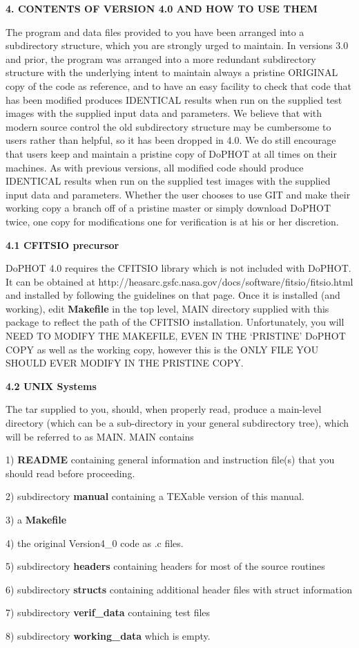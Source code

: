 \centerline{\bf 4.  CONTENTS OF VERSION 4.0 AND HOW TO USE THEM}

	The program and data files provided to you have been arranged 
into a subdirectory structure, which you are strongly urged to maintain.
In versions 3.0 and prior, the program was arranged into a more 
redundant subdirectory structure with the underlying intent to maintain 
always a pristine ORIGINAL copy of the code as reference, and to have 
an easy facility to check that code that has been modified produces 
IDENTICAL results when run on the supplied test images with the 
supplied input data and parameters. We believe that with modern 
source control the old subdirectory structure may be cumbersome to 
users rather than helpful, so it has been dropped in 4.0.  We do still 
encourage that users keep and maintain a pristine copy of DoPHOT
at all times on their machines.  As with previous versions, all modified 
code should produce IDENTICAL results when run on the supplied test 
images with the supplied input data and parameters.  Whether the user 
chooses to use GIT and make their working copy a branch off of a pristine 
master or simply download DoPHOT twice, one copy for modifications 
one for verification is at his or her discretion.

\centerline{\bf 4.1 CFITSIO precursor}
	DoPHOT 4.0 requires the CFITSIO library which is not included 
with DoPHOT.  It can be obtained at 
http://heasarc.gsfc.nasa.gov/docs/software/fitsio/fitsio.html
and installed by following the guidelines on that page.  Once it is installed
(and working), edit {\bf Makefile} in the top level, MAIN directory
supplied with this package to reflect the path of the CFITSIO installation. 
Unfortunately, you will NEED TO MODIFY THE MAKEFILE, EVEN IN 
THE `PRISTINE' DoPHOT COPY as well as the working copy, however 
this is the ONLY FILE YOU SHOULD EVER MODIFY IN THE PRISTINE 
COPY. 

\centerline{\bf 4.2 UNIX Systems}

	The tar supplied to you, should, when properly read, 
produce a main-level directory (which can be a sub-directory in 
your general subdirectory tree), which will be referred to as MAIN.
MAIN contains 
\item{1)} {\bf README} containing general information and instruction file(s) that you 
should read before proceeding.
\item{2)} subdirectory {\bf manual} containing a TEXable version of this manual.
\item{3)} a {\bf Makefile}
\item{4)} the original Version4\_0 code as .c files.
\item{5)} subdirectory {\bf headers} containing headers for most of the source 
routines
\item{6)} subdirectory {\bf structs} containing additional header files with struct 
information
\item{7)} subdirectory {\bf verif\_data} containing test files
\item{8)} subdirectory {\bf working\_data} which is empty.

